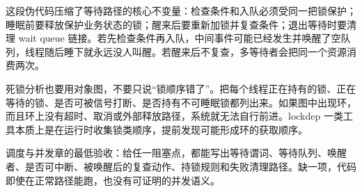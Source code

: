 这段伪代码压缩了等待路径的核心不变量：检查条件和入队必须受同一把锁保护；睡眠前要释放保护业务状态的锁；醒来后要重新加锁并复查条件；退出等待时要清理 wait queue 链接。若先检查条件再入队，中间事件可能已经发生并唤醒了空队列，线程随后睡下就永远没人叫醒。若醒来后不复查，多等待者会把同一个资源消费两次。

死锁分析也要用对象图，不要只说“锁顺序错了”。把每个线程正在持有的锁、正在等待的锁、是否可被信号打断、是否持有不可睡眠锁都列出来。如果图中出现环，而且环上没有超时、取消或外部释放路径，系统就无法自行前进。lockdep 一类工具本质上是在运行时收集锁类顺序，提前发现可能形成环的获取顺序。

\begin{rubricbox}
调度与并发章的最低验收：给任一阻塞点，都能写出等待谓词、等待队列、唤醒者、是否可中断、被唤醒后的复查动作、持锁规则和失败清理路径。缺一项，代码即使在正常路径能跑，也没有可证明的并发语义。
\end{rubricbox}



